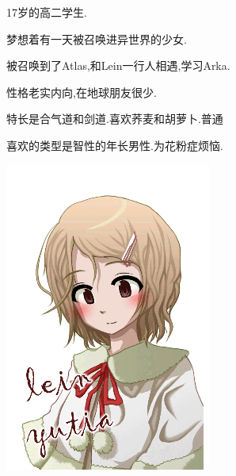 \hfill
\begin{minipage}[b]{0.6\linewidth}
17岁的高二学生.

梦想着有一天被召唤进异世界的少女.

被召唤到了Atlas,和Lein一行人相遇,学习Arka.

性格老实内向,在地球朋友很少.%

特长是合气道和剑道.喜欢荞麦和胡萝卜.{\textcolor[rgb]{1,0.92,0.92}{普通}}

喜欢的类型是智性的年长男性.为花粉症烦恼.
\end{minipage}





\begin{minipage}[b]{0.4\linewidth}

\includegraphics[width=\linewidth]{pngs/aria2.png}

\end{minipage}
